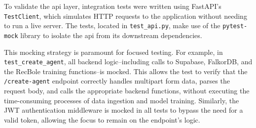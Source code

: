To validate the \acs{api} layer, integration tests were written using FastAPI's \texttt{TestClient}, which simulates HTTP requests to the application without needing to run a live server. The tests, located in \texttt{test\_api.py}, make use of the \texttt{pytest-mock} library to isolate the \acs{api} from its downstream dependencies.

This mocking strategy is paramount for focused testing. For example, in \texttt{test\_create\_agent}, all backend logic--including calls to Supabase, FalkorDB, and the RecBole training functions--is mocked. This allows the test to verify that the \texttt{/create-agent} endpoint correctly handles multipart form data, parses the request body, and calls the appropriate backend functions, without executing the time-consuming processes of data ingestion and model training. Similarly, the JWT authentication middleware is mocked in all tests to bypass the need for a valid token, allowing the focus to remain on the endpoint's logic.